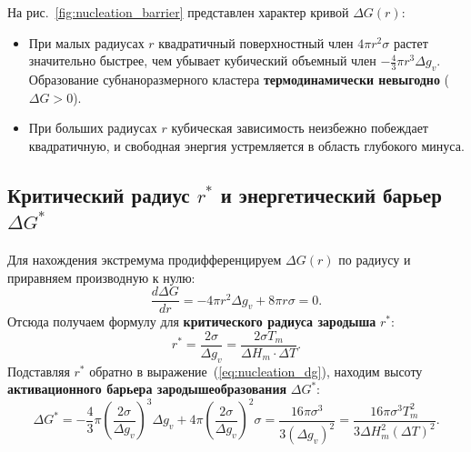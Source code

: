 \documentclass[12pt,a4paper]{article}
\begin{document}
На рис.~\ref{fig:nucleation_barrier} представлен характер кривой $\Delta G(r)$:
\begin{itemize}
    \item При малых радиусах $r$ квадратичный поверхностный член $4\pi r^2 \sigma$ растет значительно быстрее, чем убывает кубический объемный член $-\frac{4}{3}\pi r^3 \Delta g_v$. Образование субнаноразмерного кластера \textbf{термодинамически невыгодно} ($\Delta G > 0$).
    \item При больших радиусах $r$ кубическая зависимость неизбежно побеждает квадратичную, и свободная энергия устремляется в область глубокого минуса.
\end{itemize}

\subsection{Критический радиус $r^*$ и энергетический барьер $\Delta G^*$}
Для нахождения экстремума продифференцируем $\Delta G(r)$ по радиусу и приравняем производную к нулю:
\begin{equation}
\frac{d \Delta G}{dr} = -4\pi r^2 \Delta g_v + 8\pi r \sigma = 0.
\end{equation}
Отсюда получаем формулу для \textbf{критического радиуса зародыша} $r^*$:
\begin{equation}
r^* = \frac{2\sigma}{\Delta g_v} = \frac{2\sigma T_m}{\Delta H_m \cdot \Delta T}.
\label{eq:r_star}
\end{equation}
Подставляя $r^*$ обратно в выражение~(\ref{eq:nucleation_dg}), находим высоту \textbf{активационного барьера зародышеобразования} $\Delta G^*$:
\begin{equation}
\Delta G^* = -\frac{4}{3}\pi \left(\frac{2\sigma}{\Delta g_v}\right)^3 \Delta g_v + 4\pi \left(\frac{2\sigma}{\Delta g_v}\right)^2 \sigma = \frac{16\pi \sigma^3}{3 (\Delta g_v)^2} = \frac{16\pi \sigma^3 T_m^2}{3 \Delta H_m^2 (\Delta T)^2}.
\label{eq:delta_g_star}
\end{equation}
\end{document}
